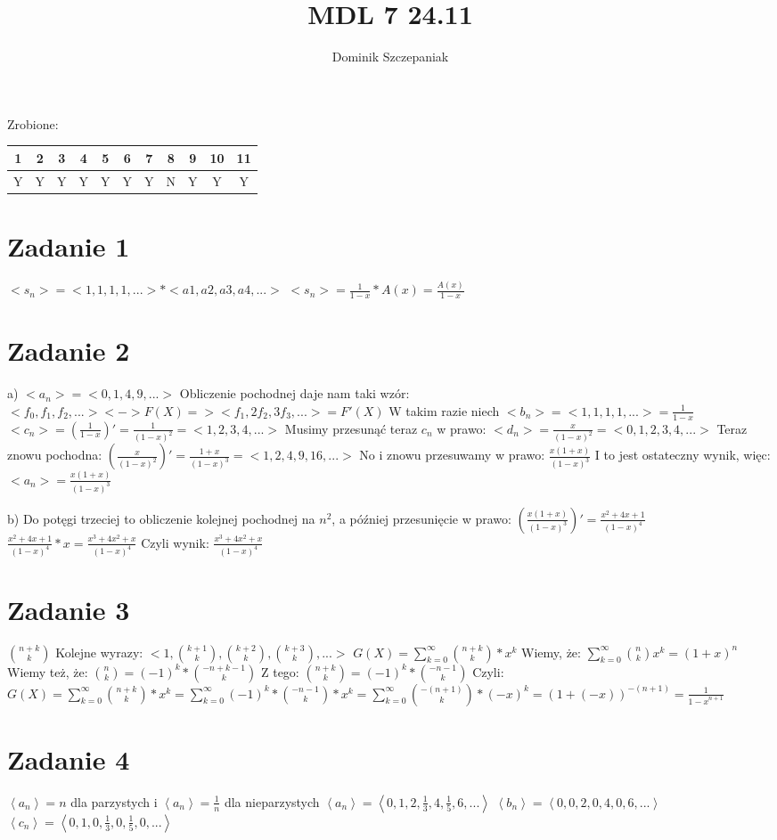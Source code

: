 \documentclass[12pt]{article}
\title{MDL 7 24.11}
\author{Dominik Szczepaniak}
\newcommand{\sequence}[1]{\left\langle #1 \right\rangle} %
\begin{document}
\maketitle
Zrobione:
\begin{tabular}{|| c c c c c c c c c c c||}
    \hline
    1 & 2 & 3 & 4 & 5 & 6 & 7 & 8 & 9 & 10 & 11  \\
    \hline
    Y & Y & Y & Y & Y & Y & Y & N & Y & Y & Y
\end{tabular}

\bgroup\obeylines
\section{Zadanie 1}
$<s_n> = <1, 1, 1, 1,...> * <a1, a2, a3, a4, ...>$
$<s_n> = \frac{1}{1-x} * A(x) = \frac{A(x)}{1-x}$
\section{Zadanie 2}
a)
$<a_n> = <0, 1, 4, 9, ...>$
Obliczenie pochodnej daje nam taki wzór:
$<f_0, f_1, f_2, ...> <-> F(X) => <f_1, 2f_2, 3f_3, ...> = F'(X)$
W takim razie niech $<b_n> = <1, 1, 1, 1, ...> = \frac{1}{1-x}$
$<c_n> = (\frac{1}{1-x})' = \frac{1}{(1-x)^2} = <1, 2, 3, 4, ...>$
Musimy przesunąć teraz $c_n$ w prawo:
$<d_n> = \frac{x}{(1-x)^2} = <0, 1, 2, 3, 4, ...>$
Teraz znowu pochodna:
$(\frac{x}{(1-x)^2})' = \frac{1+x}{(1-x)^3} = <1, 2, 4, 9, 16, ...>$
No i znowu przesuwamy w prawo:
$\frac{x(1+x)}{(1-x)^3}$ 
I to jest ostateczny wynik, więc:
$<a_n> = \frac{x(1+x)}{(1-x)^3}$ 

b)
Do potęgi trzeciej to obliczenie kolejnej pochodnej na $n^2$, a później przesunięcie w prawo:
$(\frac{x(1+x)}{(1-x)^3})' = \frac{x^2+4x+1}{(1-x)^4}$
$\frac{x^2+4x+1}{(1-x)^4} * x = \frac{x^3+4x^2+x}{(1-x)^4}$
Czyli wynik: $\frac{x^3+4x^2+x}{(1-x)^4}$
\section{Zadanie 3}
$\binom{n+k}{k}$
Kolejne wyrazy:
$<1, \binom{k+1}{k}, \binom{k+2}{k}, \binom{k+3}{k}, ...>$
$G(X) = \sum_{k=0}^{\infty} \binom{n+k}{k}*x^k$
Wiemy, że:
$\sum_{k=0}^{\infty} \binom{n}{k}x^k = (1+x)^n$
Wiemy też, że:
$\binom{n}{k} = (-1)^k * \binom{-n+k-1}{k}$
Z tego:
$\binom{n+k}{k} = (-1)^k * \binom{-n-1}{k}$
Czyli:
$G(X) = \sum_{k=0}^{\infty} \binom{n+k}{k}*x^k = \sum_{k=0}^{\infty} (-1)^k * \binom{-n-1}{k} *x^k= \sum_{k=0}^{\infty} \binom{-(n+1)}{k} * (-x)^k = (1+(-x))^{-(n+1)} = \frac{1}{{1-x}^{n+1}}$
\section{Zadanie 4}
$\sequence{a_n} = n$ dla parzystych i $\sequence{a_n} = \frac{1}{n}$ dla nieparzystych
$\sequence{a_n} = \sequence{0, 1, 2, \frac{1}{3}, 4, \frac{1}{5}, 6, ...}$
$\sequence{b_n} = \sequence{0, 0, 2, 0, 4, 0, 6, ...}$
$\sequence{c_n} = \sequence{0, 1, 0, \frac{1}{3}, 0, \frac{1}{5}, 0, ...}$
\end{document}

